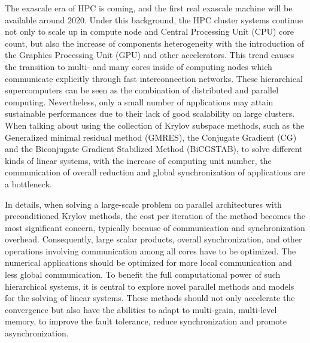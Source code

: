 The exascale era of HPC is coming, and the first real exascale machine will be available around 2020. Under this background,  the HPC cluster systems continue not only to scale up in compute node and Central Processing Unit (CPU) core count, but also the increase of components heterogeneity with the introduction of the Graphics Processing Unit (GPU) and other accelerators. This trend causes the transition to multi- and many cores inside of computing nodes which communicate explicitly through fast interconnection networks. These hierarchical supercomputers can be seen as the combination of distributed and parallel computing. Nevertheless, only a small number of applications may attain sustainable performances due to their lack of good scalability on large clusters. When talking about using the collection of Krylov subspace methods, such as the Generalized minimal residual method (GMRES), the Conjugate Gradient (CG)  and the Biconjugate Gradient Stabilized Method (BiCGSTAB), to solve different kinds of linear systems, with the increase of computing unit number, the communication of overall reduction and global synchronization of applications are a bottleneck.

In details, when solving a large-scale problem on parallel architectures with preconditioned Krylov methods, the cost per iteration of the method becomes the most significant concern, typically because of communication and synchronization overhead. Consequently, large scalar products, overall synchronization, and other operations involving communication among all cores have to be optimized. The numerical applications should be optimized for more local communication and less global communication. To benefit the full computational power of such hierarchical systems, it is central to explore novel parallel methods and models for the solving of linear systems. These methods should not only accelerate the convergence but also have the abilities to adapt to multi-grain, multi-level memory, to improve the fault tolerance, reduce synchronization and promote asynchronization.

